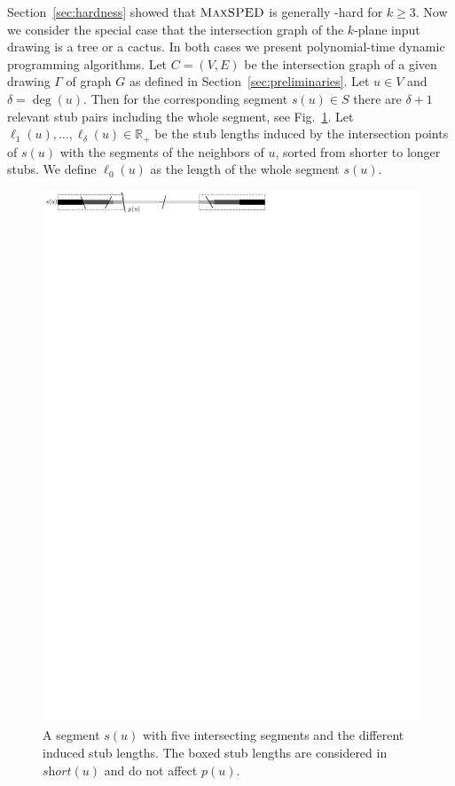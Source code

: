 \documentclass[a4paper, USenglish]{llncs}
\newcommand{\maxsped}{\ensuremath{\textsc{MaxSPED}}\xspace}
\newcommand{\solshort}{\ensuremath{\textit{short}}\xspace}
\begin{document}
	Section~\ref{sec:hardness} showed that \maxsped is generally \NP-hard for $k \ge 3$. 
	Now we consider the special case that the intersection graph of the $k$-plane input drawing is a tree or a cactus. In both cases we present polynomial-time dynamic programming algorithms. Let $ C = (V,E) $ be the intersection graph of a given drawing $\Gamma$ of graph $ G $ as defined in Section~\ref{sec:preliminaries}. 
	Let $ u \in V $ and $ \delta  = \deg(u) $. 
	Then for the corresponding segment $ s(u) \in S $ there are $ \delta + 1 $ relevant stub pairs including the whole segment, see Fig.~\ref{fig:tree}. 
	Let $ \ell_1(u), \dots, \ell_\delta(u) \in \mathbb{R}_+$ be the stub lengths induced by the intersection points of $s(u)$ with the segments of the neighbors of $u$,  sorted from shorter to longer stubs. We define  $ \ell_0(u) $ as the length of the whole segment $ s(u) $. 
	
	\begin{figure}[tbp]
		\centering
		\includegraphics{figures/tree_illustration}
		\caption{A segment $s(u)$ with five intersecting segments and the different induced stub lengths. The boxed stub lengths are considered in $\solshort(u)$ and do not affect $p(u)$.} %
		\label{fig:tree}
	\end{figure}
	
\end{document}
